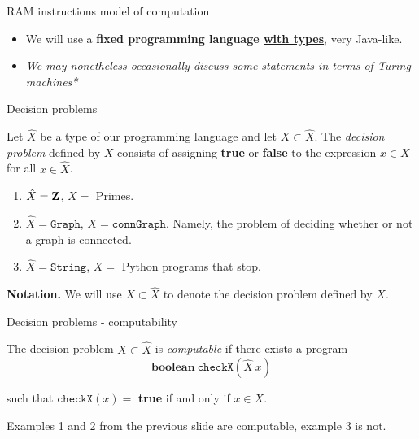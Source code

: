%

\begin{frame}{RAM instructions model of computation}
	\begin{itemize}
		\item We will use a \textbf{fixed programming language \underline{with types}},
			very Java-like.
		\item[] {\scriptsize \it *We may nonetheless occasionally discuss some statements
			in terms of Turing machines*}
	\end{itemize}
\end{frame}

%

\begin{frame}{Decision problems}
	\begin{defn}
		Let $\hat{X}$ be a type of our programming language and let
		$X \subset \hat{X}$. The \emph{decision problem} defined by $X$ consists
		of assigning \textbf{true} or \textbf{false} to the expression $x \in X$
		for all $x \in \hat{X}$. 
	\end{defn}

	\pause
	\begin{exl}
		\begin{enumerate}
			\item $\hat{X}= \mathbf{Z}$, $X=$ Primes.
			\item $\hat{X}= \mathtt{Graph}$, $X= \mathtt{connGraph}$. Namely,
				the problem of deciding whether or not a graph is
				connected.
			\item $\hat{X}= \mathtt{String}$, $X=$ Python programs that stop.
		\end{enumerate}
	\end{exl}

	\pause
	\textbf{Notation.} We will use $X \subset \hat{X}$ to denote the decision problem
	defined by $X$.
\end{frame}

%

\begin{frame}{Decision problems - computability}
	\begin{defn}
		The decision problem $X \subset \hat{X}$ is \emph{computable} if there
		exists a program
		\[
			\mathbf{boolean}\ \mathtt{checkX}(\hat{X}\ x)
		\]

		such that \(\mathtt{checkX}(x) =\) \textbf{true} if and only if
		$x \in X$.
	\end{defn}

	\pause
	\begin{exl}
		Examples 1 and 2 from the previous slide are computable, example 3 is
		not.
	\end{exl}
\end{frame}

